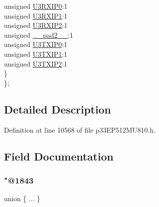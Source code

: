 \begin{DoxyCompactItemize}
\begin{tabbing}
\>\>unsigned \hyperlink{structtag_i_p_c20_b_i_t_s_ad00e8a920b50fb5f7b03823331210d22}{U3RXIP0}:1\\
\>\>unsigned \hyperlink{structtag_i_p_c20_b_i_t_s_ab13fc66361e5eb8f497605b26415529d}{U3RXIP1}:1\\
\>\>unsigned \hyperlink{structtag_i_p_c20_b_i_t_s_ab1a47687dcaeb28132079cd6fb21facd}{U3RXIP2}:1\\
\>\>unsigned \hyperlink{structtag_i_p_c20_b_i_t_s_a4d97cc5f7d51d22fc2bf3eab35c9cb7f}{\_\_pad2\_\_}:1\\
\>\>unsigned \hyperlink{structtag_i_p_c20_b_i_t_s_ae8e9eb9baafaaa0ef91a95829a1f98ad}{U3TXIP0}:1\\
\>\>unsigned \hyperlink{structtag_i_p_c20_b_i_t_s_abce207ff0767aa01ae2b16fbe3f187de}{U3TXIP1}:1\\
\>\>unsigned \hyperlink{structtag_i_p_c20_b_i_t_s_afee30693d60a7c3e69305340ebeef334}{U3TXIP2}:1\\
\>\} \\
\}; \\

\end{tabbing}\end{DoxyCompactItemize}


\subsection{Detailed Description}


Definition at line 10568 of file p33\+E\+P512\+M\+U810.\+h.



\subsection{Field Documentation}
\mbox{\label{structtag_i_p_c20_b_i_t_s_ae1402c5736ae1c2b50e4df35cee598c3}} 
\subsubsection{\texorpdfstring{"@1843}{@1843}}
{\footnotesize\ttfamily union \{ ... \} }

\mbox{\label{structtag_i_p_c20_b_i_t_s_adf71f3d8410c1f1dbbc96680a92c49af}} 
